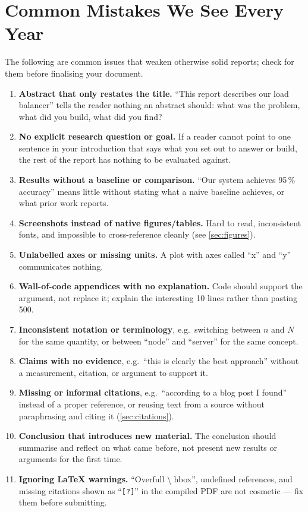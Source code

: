 \section{Common Mistakes We See Every Year}
\label{sec:mistakes}

The following are common issues that weaken otherwise solid reports;
check for them before finalising your document.

\begin{enumerate}[nosep]
      \item \textbf{Abstract that only restates the title.} ``This report
            describes our load balancer'' tells the reader nothing an
            abstract should: what was the problem, what did you build, what
            did you find?
      \item \textbf{No explicit research question or goal.} If a reader
            cannot point to one sentence in your introduction that says what
            you set out to answer or build, the rest of the report has
            nothing to be evaluated against.
      \item \textbf{Results without a baseline or comparison.} ``Our system
            achieves 95\,\% accuracy'' means little without stating what a
            naive baseline achieves, or what prior work reports.
      \item \textbf{Screenshots instead of native figures/tables.} Hard to
            read, inconsistent fonts, and impossible to cross-reference
            cleanly (see \cref{sec:figures}).
      \item \textbf{Unlabelled axes or missing units.} A plot with axes
            called ``x'' and ``y'' communicates nothing.
      \item \textbf{Wall-of-code appendices with no explanation.} Code should
            support the argument, not replace it; explain the interesting 10
            lines rather than pasting 500.
      \item \textbf{Inconsistent notation or terminology}, e.g.\ switching
            between $n$ and $N$ for the same quantity, or between ``node''
            and ``server'' for the same concept.
      \item \textbf{Claims with no evidence}, e.g.\ ``this is clearly the
            best approach'' without a measurement, citation, or argument to
            support it.
      \item \textbf{Missing or informal citations}, e.g.\ ``according to a
            blog post I found'' instead of a proper reference, or reusing
            text from a source without paraphrasing and citing it
            (\cref{sec:citations}).
      \item \textbf{Conclusion that introduces new material.} The conclusion
            should summarise and reflect on what came before, not present
            new results or arguments for the first time.
      \item \textbf{Ignoring \LaTeX{} warnings.} ``Overfull \textbackslash
            hbox'', undefined references, and missing citations shown as
            ``\texttt{[?]}'' in the compiled PDF are not cosmetic --- fix them
            before submitting.
\end{enumerate}

